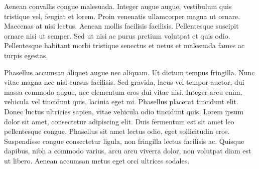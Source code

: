 \documentclass[12pt, a4paper]{article}
\begin{document}
Aenean convallis congue malesuada. Integer augue augue, vestibulum quis
tristique vel, feugiat et lorem. Proin venenatis ullamcorper magna ut ornare.
Maecenas at nisi lectus. Aenean mollis facilisis facilisis. Pellentesque
suscipit ornare nisi ut semper. Sed ut nisi ac purus pretium volutpat et quis
odio. Pellentesque habitant morbi tristique senectus et netus et malesuada
fames ac turpis egestas.

Phasellus accumsan aliquet augue nec aliquam. Ut dictum tempus fringilla. Nunc
vitae magna nec nisl cursus facilisis. Sed gravida, lacus vel tempor auctor,
dui massa commodo augue, nec elementum eros dui vitae nisi. Integer arcu enim,
vehicula vel tincidunt quis, lacinia eget mi. Phasellus placerat tincidunt
elit. Donec luctus ultricies sapien, vitae vehicula odio tincidunt quis. Lorem
ipsum dolor sit amet, consectetur adipiscing elit. Duis fermentum est sit amet
leo pellentesque congue. Phasellus sit amet lectus odio, eget sollicitudin
eros. Suspendisse congue consectetur ligula, non fringilla lectus facilisis ac.
Quisque dapibus, nibh a commodo varius, arcu arcu viverra dolor, non volutpat
diam est ut libero. Aenean accumsan metus eget orci ultrices sodales.
\end{document}
